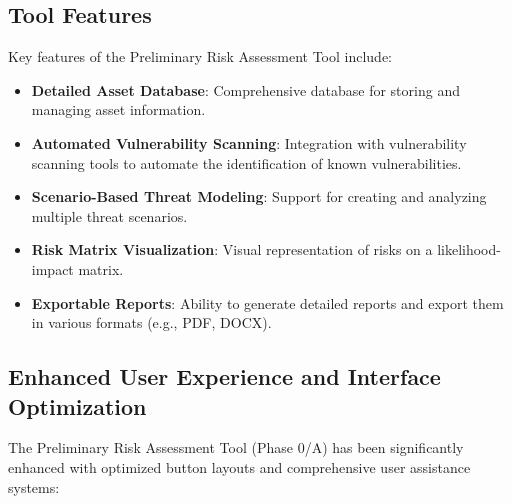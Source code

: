 \documentclass[binding=0.6cm]{sapthesis}
\begin{document}
\subsection{Tool Features}

Key features of the Preliminary Risk Assessment Tool include:

\begin{itemize}
    \item \textbf{Detailed Asset Database}: Comprehensive database for storing and managing asset information.
    \item \textbf{Automated Vulnerability Scanning}: Integration with vulnerability scanning tools to automate the identification of known vulnerabilities.
    \item \textbf{Scenario-Based Threat Modeling}: Support for creating and analyzing multiple threat scenarios.
    \item \textbf{Risk Matrix Visualization}: Visual representation of risks on a likelihood-impact matrix.
    \item \textbf{Exportable Reports}: Ability to generate detailed reports and export them in various formats (e.g., PDF, DOCX).
\end{itemize}

\subsection{Enhanced User Experience and Interface Optimization}

The Preliminary Risk Assessment Tool (Phase 0/A) has been significantly enhanced with optimized button layouts and comprehensive user assistance systems:
\end{document}
